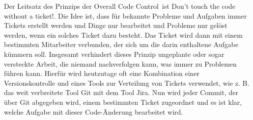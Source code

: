 Der Leitsatz des Prinzips der \glqq Overall Code Control\grqq\ ist \glqq Don't touch the code without a ticket!\grqq . Die Idee ist, dass für bekannte Probleme und Aufgaben immer Tickets erstellt werden und Dinge nur bearbeitet und Probleme nur gelöst werden, wenn ein solches Ticket dazu besteht. Das Ticket wird dann mit einem bestimmten Mitarbeiter verbunden, der sich um die darin enthaltene Aufgabe kümmern soll. Insgesamt verhindert dieses Prinzip ungeplante oder sogar versteckte Arbeit, die niemand nachverfolgen kann, was immer zu Problemen führen kann. Hierfür wird heutzutage oft eine Kombination einer Versionskontrolle und eines Tools zur Verteilung von Tickets verwendet, wie z. B. das weit verbreitete Tool Git mit dem Tool Jira. Nun wird jeder Commit, der über Git abgegeben wird, einem bestimmten Ticket zugeordnet und es ist klar, welche Aufgabe mit dieser Code-Änderung bearbeitet wird.

